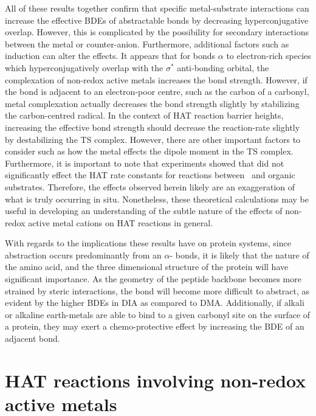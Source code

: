 All of these results together confirm that specific metal-substrate interactions
can increase the effective BDEs of abstractable  bonds by decreasing
hyperconjugative overlap. However, this is complicated by the possibility for
secondary interactions between the metal or counter-anion. Furthermore,
additional factors such as induction can alter the effects. It appears that for
 bonds $\alpha$ to electron-rich species which hyperconjugatively
overlap with the $\sigma^*$ anti-bonding orbital, the complexation of non-redox
active metals increases the  bond strength. However, if the 
bond is adjacent to an electron-poor centre, such as the carbon of a carbonyl,
metal complexation actually decreases the bond strength slightly by stabilizing
the carbon-centred radical.  In the context of HAT reaction barrier heights,
increasing the effective  bond strength should decrease the
reaction-rate slightly by destabilizing the TS complex. However, there are other
important factors to consider such as how the metal effects the dipole moment in
the TS complex.  Furthermore, it is important to note that experiments showed
that  did not significantly effect the HAT rate constants for
reactions between \cumo\ and organic substrates. Therefore, the effects observed
herein likely are an exaggeration of what is truly occurring in situ.
Nonetheless, these theoretical calculations may be useful in developing an
understanding of the subtle nature of the effects of non-redox active metal
cations on HAT reactions in general.

With regards to the implications these results have on protein systems, since
abstraction occurs predominantly from an $\alpha$- bonds, it is likely
that the nature of the amino acid, and the three dimensional structure of the
protein will have significant importance. As the geometry of the peptide
backbone becomes more strained by steric interactions, the  bond will
become more difficult to abstract, as evident by the higher  BDEs in DIA
as compared to DMA. Additionally, if alkali or alkaline earth-metals are able to
bind to a given carbonyl site on the surface of a protein, they may exert a
chemo-protective effect by increasing the BDE of an adjacent 
bond.

\section{HAT reactions involving non-redox active metals}

